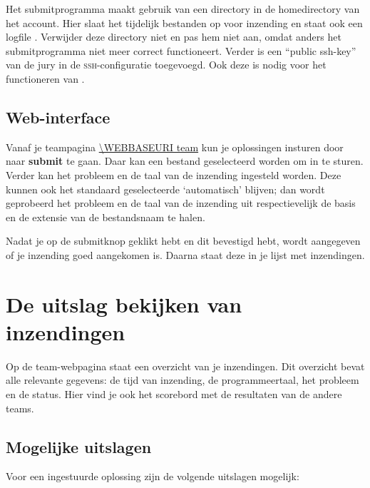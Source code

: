 Het submitprogramma maakt gebruik van een directory \cmd{\USERSUBMITDIR}
in de homedirectory van het account. Hier slaat het tijdelijk
bestanden op voor inzending en staat ook een logfile .
Verwijder deze directory niet en pas hem niet aan, omdat anders het
submitprogramma niet meer correct functioneert. Verder is een
``public ssh-key'' van de jury in de \textsc{ssh}-configuratie
toegevoegd. Ook deze is nodig voor het functioneren van .

\subsection{Web-interface}

Vanaf je teampagina \url{\WEBBASEURI team} kun je oplossingen insturen
door naar \textbf{submit} te gaan. Daar kan een bestand
geselecteerd worden om in te sturen. Verder kan het probleem en de
taal van de inzending ingesteld worden. Deze kunnen ook het
standaard geselecteerde `automatisch' blijven; dan wordt
geprobeerd het probleem en de taal van de inzending uit
respectievelijk de basis en de extensie van de bestandsnaam te halen.

Nadat je op de submitknop geklikt hebt en dit bevestigd hebt, wordt
aangegeven of je inzending goed aangekomen is. Daarna staat deze in je
lijst met inzendingen.

\section{De uitslag bekijken van inzendingen}

Op de team-webpagina staat een overzicht van je inzendingen.
Dit overzicht bevat alle relevante gegevens: de tijd van inzending, de
programmeertaal, het probleem en de status. Hier vind je ook het scorebord
met de resultaten van de andere teams.

\subsection{Mogelijke uitslagen}

Voor een ingestuurde oplossing zijn de volgende uitslagen mogelijk:

